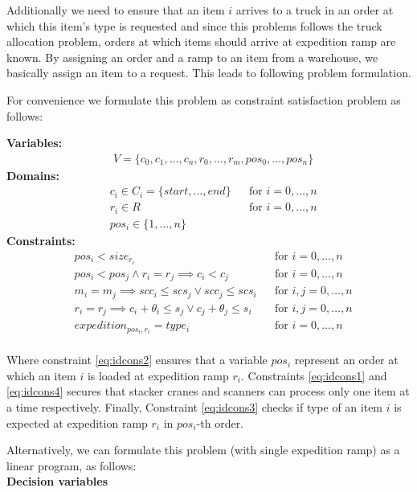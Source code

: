 \documentclass{ctuthesis}
\begin{document}
Additionally we need to ensure that an item $i$ arrives to a truck in an order at which this item's type is requested and since this problems follows the truck allocation problem, orders at which items should arrive at expedition ramp are known. By assigning an order and a ramp to an item from a warehouse, we basically assign an item to a request. This leads to following problem formulation.

For convenience we formulate this problem as constraint satisfaction problem as follows:

\textbf{Variables:}
\begin{align}
    &V = \{c_{0}, c_{1}, \ldots, c_{n},r_0, \ldots, r_m, pos_0, \ldots, pos_n\}
\end{align}
\textbf{Domains:}
\begin{align}
&c_{i} \in C_i = \{start, ..., end\} && \text{for } i=0,\ldots,n\\
&r_{i} \in R && \text{for } i=0,\ldots,n\\
&pos_i \in \{1, \ldots, n\}
\end{align}
\textbf{Constraints:}
 \begin{align}
& pos_i < size_{r_i} && \text{for } i=0,\ldots,n \nonumber \\
& pos_i < pos_j \land r_i = r_j \implies c_i < c_j && \text{for } i=0,\ldots,n\\ \label{eq:idcons2}
& m_i = m_j \implies scc_i \leq scs_j \lor scc_j \leq scs_i && \text{for } i,j=0,\ldots,n\\ \label{eq:idcons1}
& r_i = r_j \implies c_i  + \theta_i \leq s_j \lor c_j + \theta_j \leq s_i && \text{for } i,j=0,\ldots,n\\ \label{eq:idcons4}
& expedition_{pos_i,r_i} = type_i  && \text{for } i=0,\ldots,n\\ \label{eq:idcons3}
\end{align}

Where constraint \ref{eq:idcons2} ensures that a variable $pos_i$ represent an order at which an item $i$ is loaded at expedition ramp $r_i$. Constraints \ref{eq:idcons1} and \ref{eq:idcons4} secures that stacker cranes and scanners can process only one item at a time respectively. Finally, Constraint \ref{eq:idcons3} checks if type of an item $i$ is expected at expedition ramp $r_i$ in $pos_i$-th order.

Alternatively, we can formulate this problem (with single expedition ramp) as a linear program, as follows:\\
\textbf{Decision variables}
\end{document}
